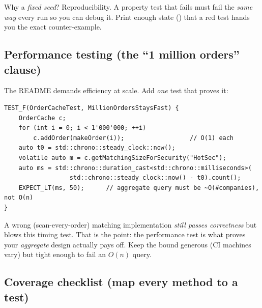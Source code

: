 \begin{intu}
Why a \emph{fixed seed}? Reproducibility. A property test that fails must fail the
\emph{same way} every run so you can debug it. Print enough state
() that a red test hands you the exact counter-example.
\end{intu}

\subsection{Performance testing (the ``1 million orders'' clause)}

The README demands efficiency at scale. Add \emph{one} test that proves it:

\begin{lstlisting}
TEST_F(OrderCacheTest, MillionOrdersStaysFast) {
    OrderCache c;
    for (int i = 0; i < 1'000'000; ++i)
        c.addOrder(makeOrder(i));                  // O(1) each
    auto t0 = std::chrono::steady_clock::now();
    volatile auto m = c.getMatchingSizeForSecurity("HotSec");
    auto ms = std::chrono::duration_cast<std::chrono::milliseconds>(
                  std::chrono::steady_clock::now() - t0).count();
    EXPECT_LT(ms, 50);      // aggregate query must be ~O(#companies), not O(n)
}
\end{lstlisting}

\begin{pitfall}
A wrong (scan-every-order) matching implementation \emph{still passes correctness}
but blows this timing test. That is the point: the performance test is what proves
your \emph{aggregate} design actually pays off. Keep the bound generous (CI
machines vary) but tight enough to fail an $O(n)$ query.
\end{pitfall}

\subsection{Coverage checklist (map every method to a test)}

